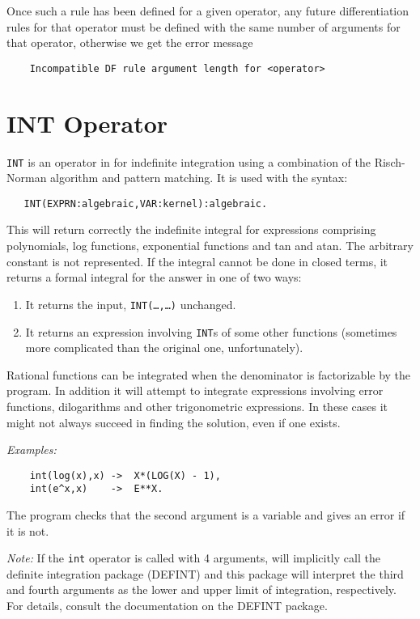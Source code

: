 Once such a rule has been defined for a given operator, any future
differentiation rules for that operator must be
defined with the same number of arguments for that operator, otherwise we
get the error message
\begin{verbatim}
	Incompatible DF rule argument length for <operator>
\end{verbatim}

\section{INT Operator}
{\tt INT} is an operator in {\REDUCE} for indefinite
integration using a
combination of the Risch-Norman algorithm and pattern matching.  It is
used with the syntax:
\begin{verbatim}
   INT(EXPRN:algebraic,VAR:kernel):algebraic.
\end{verbatim}
This will return correctly the indefinite integral for expressions comprising
polynomials, log functions, exponential functions and tan and atan. The
arbitrary constant is not represented. If the integral cannot be done in
closed terms, it returns a formal integral for the answer in one of two ways:
\begin{enumerate}
\item It returns the input, {\tt INT(\ldots,\ldots)} unchanged.

\item It returns an expression involving {\tt INT}s of some
      other functions (sometimes more complicated than
      the original one, unfortunately).
\end{enumerate}
Rational functions can be integrated when the denominator is factorizable
by the program. In addition it will attempt to integrate expressions
involving error functions, dilogarithms and other trigonometric
expressions. In these cases it might not always succeed in finding the
solution, even if one exists.

{\it Examples:}
\begin{verbatim}
	int(log(x),x) ->  X*(LOG(X) - 1),
	int(e^x,x)    ->  E**X.
\end{verbatim}
The program checks that the second argument is a variable and gives an
error if it is not.

{\it Note:} If the {\tt int} operator is called with 4 arguments,
{\REDUCE} will implicitly call the definite integration package (DEFINT)
and this package will interpret the third and fourth arguments as the lower
and upper limit of integration, respectively.  For details, consult
the documentation on the DEFINT package.


